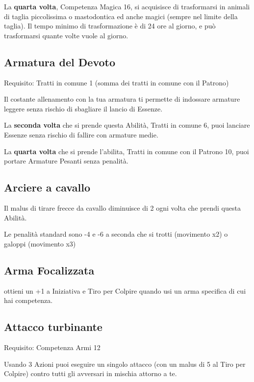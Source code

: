 \documentclass[a4paper,11pt,twoside,openany]{book}
\begin{document}
La \textbf{quarta volta}, Competenza Magica 16, si acquisisce di trasformarsi in animali di taglia piccolissima o mastodontica ed anche magici (sempre nel limite della taglia). Il tempo minimo di trasformazione è di 24 ore al giorno, e può trasformarsi quante volte vuole al giorno.

\subsection{Armatura del Devoto}

Requisito: Tratti in comune 1 (somma dei tratti in comune con il Patrono)

Il costante allenamento con la tua armatura ti permette di indossare armature leggere senza rischio di sbagliare il lancio di Essenze.

La \textbf{seconda volta} che si prende questa Abilità, Tratti in comune 6, puoi lanciare Essenze senza rischio di fallire con armature medie.

La \textbf{quarta volta} che si prende l'abilita, Tratti in comune con il Patrono 10, puoi portare Armature Pesanti senza penalità.

\subsection{Arciere a cavallo}

Il malus di tirare frecce da cavallo diminuisce di 2 ogni volta che prendi questa Abilità.

Le penalità standard sono -4 e -6 a seconda che si trotti (movimento x2) o galoppi (movimento x3)

\subsection{Arma Focalizzata}

ottieni un +1 a Iniziativa e Tiro per Colpire quando usi un arma specifica di cui hai competenza.

\subsection{Attacco turbinante}

Requisito: Competenza Armi 12

Usando 3 Azioni puoi eseguire un singolo attacco (con un malus di 5 al Tiro per Colpire) contro tutti gli avversari in mischia attorno a te.
\end{document}
